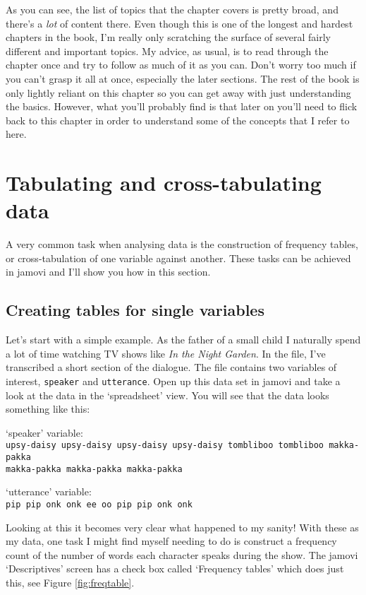 As you can see, the list of topics that the chapter covers is pretty broad, and there's a {\it lot} of content there. Even though this is one of the longest and hardest chapters in the book, I'm really only scratching the surface of several fairly different and important topics. My advice, as usual, is to read through the chapter once and try to follow as much of it as you can. Don't worry too much if you can't grasp it all at once, especially the later sections. The rest of the book is only lightly reliant on this chapter so you can get away with just understanding the basics. However, what you'll probably find is that later on you'll need to flick back to this chapter in order to understand some of the concepts that I refer to here.


\section{Tabulating and cross-tabulating data\label{sec:freqtables}}

A very common task when analysing data is the construction of frequency tables, or cross-tabulation of one variable against another. These tasks can be achieved in jamovi and I'll show you how in this section. 

\subsection{Creating tables for single variables}

Let's start with a simple example. As the father of a small child I naturally spend a lot of time watching TV shows like {\it In the Night Garden}. In the  file, I've transcribed a short section of the dialogue. The file contains two variables of interest, \texttt{speaker} and \texttt{utterance}. Open up this data set in jamovi and take a look at the data in the `spreadsheet' view. You will see that the data looks something like this:

\noindent
`speaker' variable: \\
\texttt{upsy-daisy upsy-daisy upsy-daisy upsy-daisy tombliboo tombliboo makka-pakka \\ makka-pakka makka-pakka makka-pakka} 

\noindent
`utterance' variable: \\
\texttt{pip pip onk onk ee oo pip pip onk onk} 

\noindent
Looking at this it becomes very clear what happened to my sanity! With these as my data, one task I might find myself needing to do is construct a frequency count of the number of words each character speaks during the show. The jamovi `Descriptives' screen has a check box called `Frequency tables' which does just this, see Figure \ref{fig:freqtable}. 

